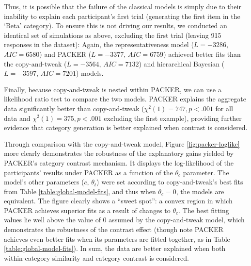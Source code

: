 \documentclass[12pt]{article}
\begin{document}
\begin{flushleft}
Thus, it is possible that the failure of the classical models is simply due to
their inability to explain each participant's first trial (generating the first
item in the `Beta' category). To ensure this is not driving our results, we
conducted an identical set of simulations as above, excluding the first trial
(leaving 915 responses in the dataset): Again, the representativeness model ($L
= -3286$, $AIC = 6580$) and PACKER ($L = -3377$,
$AIC = 6759$) achieved better fits than the copy-and-tweak ($L = -3564$,
$AIC = 7132$) and hierarchical Bayesian ($L = -3597$, $AIC = 7201$) models.

Finally, because copy-and-tweak is nested within PACKER, we can use a likelihood
ratio test to compare the two models. PACKER explains the aggregate data
significantly better than copy-and-tweak ($\chi^2(1) = 747, p < .001$ for all
data and $\chi^2(1) = 375, p < .001$ excluding the first example), providing
further evidence that category generation is better explained when contrast is
considered.

Through comparison with the copy-and-tweak model, Figure
\ref{fig:packer-loglike} more clearly demonstrates the robustness of the
explanatory gains yielded by PACKER's category contrast mechanism. It displays
the log-likelihood of the participants' results under PACKER as a function of
the $\theta_c$ parameter. The model's other parameters ($c$,
$\theta_t$) were set according to copy-and-tweak's best fits from Table
\ref{table:global-model-fits}, and thus when $\theta_c=0$, the models are
equivalent. The figure clearly shows a ``sweet spot'': a convex region in which
PACKER achieves superior fits as a result of changes to $\theta_c$. The
best fitting values lie well above the value of 0 assumed by the copy-and-tweak
model, which demonstrates the robustness of the contrast effect (though note
PACKER achieves even better fits when its parameters are fitted together, as in
Table \ref{table:global-model-fits}). In sum, the data are better explained when
both within-category similarity and category contrast is considered.


\end{flushleft}
\end{document}

